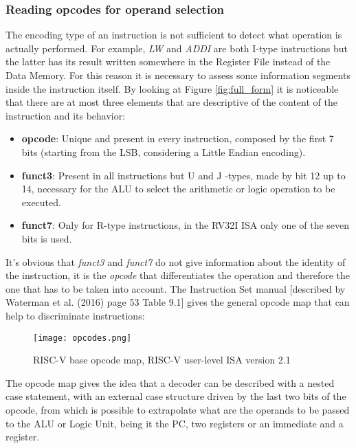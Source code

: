 \subsubsection{Reading opcodes for operand selection}
The encoding type of an instruction is not sufficient to detect what operation is actually performed. For example, \emph{LW} and \emph{ADDI} are both I-type instructions but the latter has its result written somewhere in the Register File instead of the Data Memory.
For this reason it is necessary to assess some information segments inside the instruction itself. By looking at Figure \ref{fig:full_form} it is noticeable that there are at most three elements that are descriptive of the content of the instruction and its behavior:
\begin{itemize}
  \item \textbf{opcode}: Unique and present in every instruction, composed by the first 7 bits (starting from the LSB, considering a Little Endian encoding).
  \item \textbf{funct3}: Present in all instructions but U and J -types, made by bit 12 up to 14, necessary for the ALU to select the arithmetic or logic operation to be executed.
  \item \textbf{funct7}: Only for R-type instructions, in the RV32I ISA only one of the seven bits is used.
\end{itemize}
It's obvious that \emph{funct3} and \emph{funct7} do not give information about the identity of the instruction, it is the \emph{opcode} that differentiates the operation and therefore the one that has to be taken into account. The Instruction Set manual [described by Waterman et al. (2016) \cite{waterman2016riscv} page 53 Table 9.1] gives the general opcode map that can help to discriminate instructions: 

\begin{figure}[h!]
  \centering
  \texttt{[image: opcodes.png]}
  \caption{RISC-V base opcode map, RISC-V user-level ISA version 2.1 \cite{waterman2016riscv}} 
  \label{fig:opcode_map}
\end{figure}

The opcode map gives the idea that a decoder can be described with a nested case statement, with an external case structure driven by the last two bits of the opcode, from which is possible to extrapolate what are the operands to be passed to the ALU or Logic Unit, being it the PC, two registers or an immediate and a register.  

